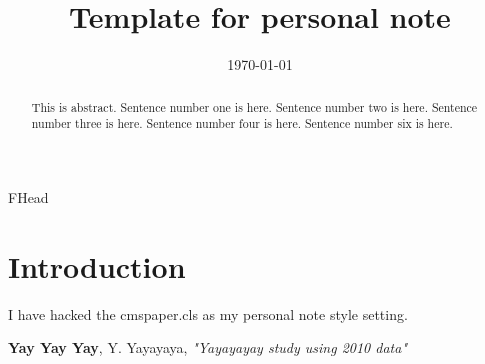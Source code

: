\documentclass{fheadnote}
\begin{document}
\begin{titlepage}

   \date{\today}

   \title{Template for personal note}

   \begin{Authlist}
      FHead
   \end{Authlist}


  \begin{abstract}
     This is abstract.  Sentence number one is here.  Sentence number two is here.  Sentence number three is here.
     Sentence number four is here.  Sentence number six is here.
  \end{abstract}

\end{titlepage}

\setcounter{page}{2}

\section{Introduction}

I have hacked the cmspaper.cls as my personal note style setting.

\begin{thebibliography}{9}
    {\bf Yay Yay Yay},
      Y. Yayayaya,
      {\em "Yayayayay study using 2010 data"}
\end{thebibliography}
 
\pagebreak
\end{document}
